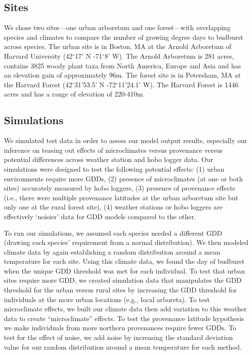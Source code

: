 \documentclass{article}\usepackage[]{graphicx}\usepackage[]{color}
\begin{document}
\subsection*{Sites}
We chose two sites---one urban arboretum and one forest---with overlapping species and climates to compare the number of growing degree days to budburst across species. The urban site is in Boston, MA at the Arnold Arboretum of Harvard University (42$^{\circ}$17' N -71$^{\circ}$8' W). The Arnold Arboretum is 281 acres, contains 3825 woody plant taxa from North America, Europe and Asia and has an elevation gain of approximately 96m. The forest site is in Petersham, MA at the Harvard Forest (42$^{\circ}$31'53.5' N -72$^{\circ}$11'24.1' W). The Harvard Forest is 1446 acres and has a range of elevation of 220-410m. 

\subsection*{Simulations}
We simulated test data in order to assess our model output results, especially our inference on teasing out effects of microclimates versus provenance versus potential differences across weather station and hobo logger data. Our simulations were designed to test the following potential effects: (1) urban environments require more GDDs, (2) presence of microclimates (at one or both sites) accurately measured by hobo loggers, (3) presence of provenance effects (i.e., there were multiple provenance latitudes at the urban arboretum site but only one at the rural forest site), (4) weather stations or hobo loggers are effectively `noisier' data for GDD models compared to the other. 

To run our simulations, we assumed each species needed a different GDD (drawing each species' requirement from a normal distribution). We then modeled climate data by again establishing a random distribution around a mean temperature for each site. Using this climate data, we found the day of budburst when the unique GDD threshold was met for each individual. To test that urban sites require more GDD, we created simulation data that manipulates the GDD threshold for the urban versus rural sites by increasing the GDD threshold for individuals at the more urban locations (e.g., local arboreta). To test microclimate effects, we built our climate data then add variation to this weather data to create ``microclimate'' effects. To test the provenance latitude hypothesis we make individuals from more northern provenances require fewer GDDs. To test for the effect of noise, we add noise by increasing the standard deviation value for our random distribution around a mean temperature for each method.
\end{document}
